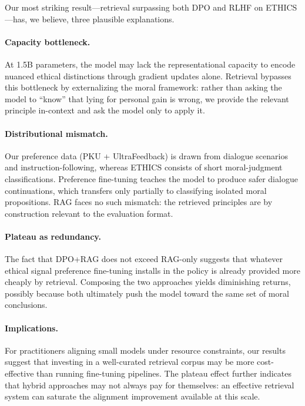 Our most striking result—retrieval surpassing both DPO and RLHF on ETHICS—has, we believe, three plausible explanations.

\paragraph{Capacity bottleneck.} At 1.5B parameters, the model may lack the representational capacity to encode nuanced ethical distinctions through gradient updates alone. Retrieval bypasses this bottleneck by externalizing the moral framework: rather than asking the model to ``know'' that lying for personal gain is wrong, we provide the relevant principle in-context and ask the model only to apply it.

\paragraph{Distributional mismatch.} Our preference data (PKU + UltraFeedback) is drawn from dialogue scenarios and instruction-following, whereas ETHICS consists of short moral-judgment classifications. Preference fine-tuning teaches the model to produce safer dialogue continuations, which transfers only partially to classifying isolated moral propositions. RAG faces no such mismatch: the retrieved principles are by construction relevant to the evaluation format.

\paragraph{Plateau as redundancy.} The fact that DPO+RAG does not exceed RAG-only suggests that whatever ethical signal preference fine-tuning installs in the policy is already provided more cheaply by retrieval. Composing the two approaches yields diminishing returns, possibly because both ultimately push the model toward the same set of moral conclusions.

\paragraph{Implications.} For practitioners aligning small models under resource constraints, our results suggest that investing in a well-curated retrieval corpus may be more cost-effective than running fine-tuning pipelines. The plateau effect further indicates that hybrid approaches may not always pay for themselves: an effective retrieval system can saturate the alignment improvement available at this scale.

